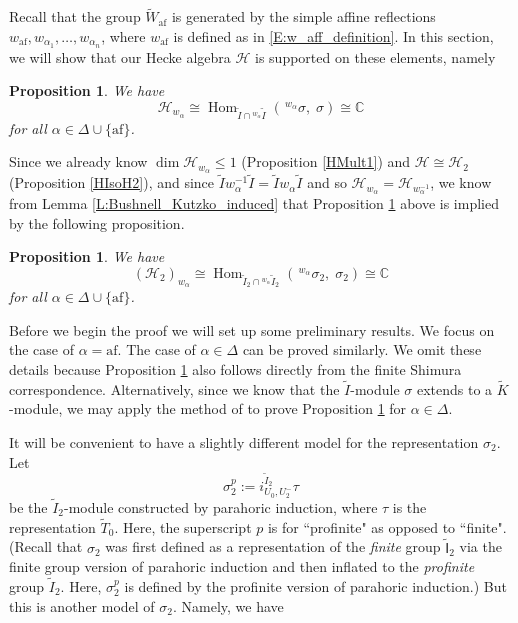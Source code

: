 \documentclass[10pt, letterpaper]{amsart}
\theoremstyle{plain}
\newtheorem{Prop}[equation]{Proposition}
\theoremstyle{definition}
\numberwithin{equation}{section}
\newcommand{\It}{\widetilde{I}}
\newcommand{\Kt}{\widetilde{K}}
\newcommand{\Tt}{\widetilde{T}}
\newcommand{\Wt}{\widetilde{W}}
\newcommand{\Hom}{\operatorname{Hom}}
\newcommand{\af}{\mathrm{af}}
\newcommand{\Hcal}{\mathcal{H}}
\newcommand{\Ift}{\widetilde{\mathsf{I}}}
\begin{document}
Recall that the group $\Wt_{\af}$ is generated by the simple affine reflections $w_{\af}, w_{\alpha_1}, \dots, w_{\alpha_n}$, where $w_{\af}$ is defined as in \eqref{E:w_aff_definition}. In this section, we will show that our Hecke algebra $\Hcal$ is supported on these elements, namely

\begin{Prop} \label{affSupp_H}
	We have
	\begin{equation*}
		\Hcal_{w_{\alpha}}\cong \Hom_{\It\cap{^{w_{\alpha}}\It}}(\,^{w_{\alpha}}\sigma,\;\sigma)\cong \mathbb{C}
	\end{equation*}
    for all $\alpha\in\Delta\cup\{\af\}$.
\end{Prop}

Since we already know $\dim\Hcal_{w_{\alpha}}\leq 1$ (Proposition \ref{HMult1}) and $\Hcal\cong\Hcal_2$ (Proposition \ref{HIsoH2}), and since $\It w_{\alpha}^{-1}\It=\It w_{\alpha}\It$ and so $\Hcal_{w_{\alpha}}=\Hcal_{w_{\alpha}^{-1}}$, we know from Lemma \ref{L:Bushnell_Kutzko_induced} that Proposition \ref{affSupp_H} above is implied by the following proposition.
\begin{Prop} \label{affSupp}
	We have
	\begin{equation*}
		(\Hcal_2)_{w_{\alpha}}\cong \Hom_{\It_2\cap{^{w_{\alpha}}\It_2}}(\,^{w_{\alpha}}\sigma_{2},\;\sigma_{2})\cong \mathbb{C}
	\end{equation*}
    for all $\alpha\in\Delta\cup\{\af\}$.
\end{Prop}


Before we begin the proof we will set up some preliminary results. We focus on the case of $\alpha=\af$. The case of $\alpha\in\Delta$ can be proved similarly. We omit these details because Proposition \ref{affSupp_H} also follows directly from the finite Shimura correspondence. Alternatively, since we know that the $\It$-module $\sigma$ extends to a $\Kt$-module, we may apply the method of \cite{Takeda_Wood} to prove Proposition \ref{affSupp_H} for $\alpha\in\Delta$.


It will be convenient to have a slightly different model for the representation $\sigma_{2}$. Let 
\begin{equation}\label{E:profinite_model_sigma_2}
\sigma_{2}^{p}:=i_{U_{0},U^{-}_{2}}^{\It_2}\tau
\end{equation}
be the $\It_2$-module constructed by parahoric induction, where $\tau$ is the representation $\Tt_{0}$. Here, the superscript $p$ is for ``profinite" as opposed to ``finite". (Recall that $\sigma_{2}$ was first defined as a representation of the {\it finite} group $\Ift_{2}$ via the finite group version of parahoric induction and then inflated to the {\it profinite} group $\It_2$. Here, $\sigma_2^p$ is defined by the profinite version of parahoric induction.) But this is another model of $\sigma_2$. Namely, we have
\end{document}
